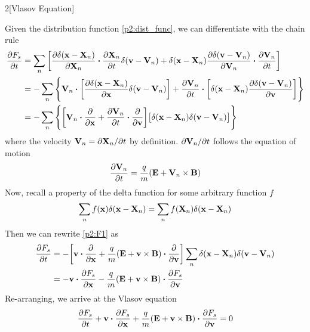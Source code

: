 \documentclass[12pt]{article}
\begin{document}
\begin{problem}{2}[Vlasov Equation]
\begin{solution}
    Given the distribution function \eqref{p2:dist_func}, we can differentiate
    with the chain rule
    \begin{align}\label{p2:F1}
        \frac{\partial F_s}{\partial t}
        &=\sum_n\qty[
            \frac{\partial\delta(\vb{x}-\vb{X}_n)}{\partial\vb{X}_n}
            \vdot\frac{\partial\vb{X}_n}{\partial t}\delta(\vb{v}-\vb{V}_n)
            +\delta(\vb{x}-\vb{X}_n)
            \frac{\partial\delta(\vb{v}-\vb{V}_n)}{\partial\vb{V}_n}\vdot\frac{\partial\vb{V}_n}{\partial
            t}
        ]\notag\\
        &=-\sum_n\qty{
            \vb{V}_n\vdot\qty[
            \frac{\partial\delta(\vb{x}-\vb{X}_n)}{\partial\vb{x}}
            \delta(\vb{v}-\vb{V}_n)]
        +\frac{\partial\vb{V}_n}{\partial t}\vdot
        \qty[\delta(\vb{x}-\vb{X}_n)\frac{\partial\delta(\vb{v}-\vb{V}_n)}{\partial\vb{v}}]
        }\notag\\
        &=-\sum_n\qty{
            \qty[
                \vb{V}_n\vdot\frac{\partial}{\partial\vb{x}}
            +\frac{\partial\vb{V}_n}{\partial t}
            \vdot\frac{\partial}{\partial\vb{v}}
            ]
            \qty[\delta(\vb{x}-\vb{X}_n)\delta(\vb{v}-\vb{V}_n)]
        }
    \end{align}
    where the velocity $\vb{V}_n=\partial\vb{X}_n/\partial t$ by definition.
    $\partial\vb{V}_n/\partial t$ follows the equation of motion
    \begin{equation}
        \frac{\partial\vb{V}_n}{\partial
        t}=\frac{q}{m}\qty(\vb{E}+\vb{V}_n\times\vb{B}) 
    \end{equation}
    Now, recall a property of the delta function for some arbitrary function 
    $f$
    \begin{equation}
        \sum_nf(\vb{x})\delta(\vb{x}-\vb{X}_n)
        =\sum_nf(\vb{X}_n)\delta(\vb{x}-\vb{X}_n)
    \end{equation}
    Then we can rewrite \eqref{p2:F1} as
    \begin{align}
        \frac{\partial F_s}{\partial t}
        &=-\qty[
            \vb{v}\vdot\frac{\partial}{\partial\vb{x}}
            +\frac{q}{m}\qty(\vb{E}+\vb{v}\times\vb{B})\vdot\frac{\partial}{\partial\vb{v}}
        ]
            \sum_n \delta(\vb{x}-\vb{X}_n)\delta(\vb{v}-\vb{V}_n)\notag\\
        &=-\vb{v}\vdot\frac{\partial F_s}{\partial\vb{x}}
        -\frac{q}{m}\qty(\vb{E}+\vb{v}\times\vb{B})\vdot\frac{\partial
        F_s}{\partial\vb{v}}
    \end{align}
    Re-arranging, we arrive at the Vlasov equation
    \begin{equation}
        \frac{\partial F_s}{\partial t} 
        +\vb{v}\vdot\frac{\partial F_s}{\partial\vb{x}}
        +\frac{q}{m}\qty(\vb{E}+\vb{v}\times\vb{B})\vdot\frac{\partial
        F_s}{\partial\vb{v}}
        =0
    \end{equation}
\end{solution}
    
\end{problem}
\end{document}
